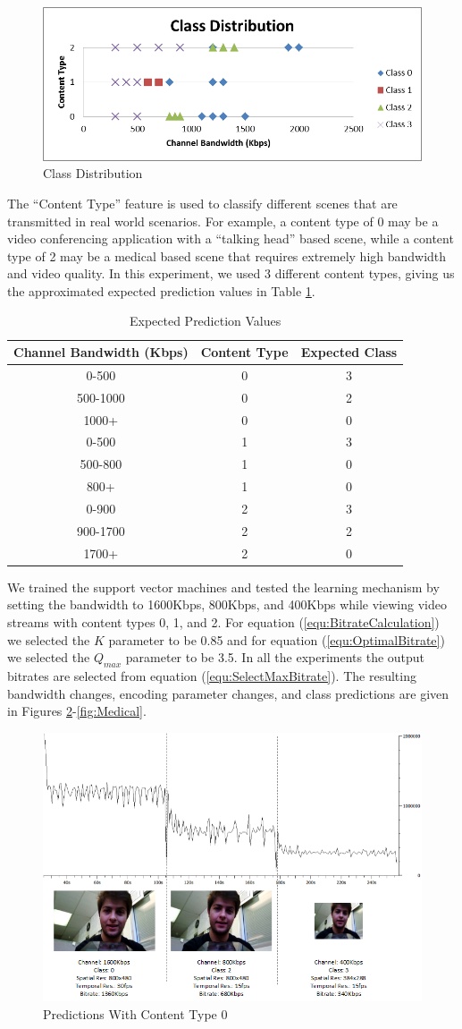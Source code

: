 \documentclass[preprint, 12pt]{elsarticle}
\begin{document}
\begin{figure}[h]
\centering
\includegraphics[width=0.5\linewidth]{ClassDistribution.png}
\caption{Class Distribution}
\label{fig:ClassDistribution}
\end{figure}
The ``Content Type'' feature is used to classify different scenes that are transmitted in real world scenarios. For example, a content type of 0 may be a video conferencing application with a ``talking head'' based scene, while a content type of 2 may be a medical based scene that requires extremely high bandwidth and video quality. In this experiment, we used 3 different content types, giving us the approximated expected prediction values in Table \ref{tab:ExpectedValues}.
\begin{table}
\caption{Expected Prediction Values}
\label{tab:ExpectedValues}
\begin{tabular}{c|c|c}
\textbf{Channel Bandwidth (Kbps)}&\textbf{Content Type}&\textbf{Expected Class}\\
\hline
0-500&0&3\\
500-1000&0&2\\
1000+&0&0\\
0-500&1&3\\
500-800&1&0\\
800+&1&0\\
0-900&2&3\\
900-1700&2&2\\
1700+&2&0
\end{tabular}
\end{table}
We trained the support vector machines and tested the learning mechanism by setting the bandwidth to 1600Kbps, 800Kbps, and 400Kbps while viewing video streams with content types 0, 1, and 2. For equation (\ref{equ:BitrateCalculation}) we selected the $K$ parameter to be 0.85 and for equation (\ref{equ:OptimalBitrate}) we selected the $Q_{max}$ parameter to be 3.5. In all the experiments the output bitrates are selected from equation (\ref{equ:SelectMaxBitrate}). The resulting bandwidth changes, encoding parameter changes, and class predictions are given in Figures \ref{fig:TalkingHead}-\ref{fig:Medical}.
\begin{figure}[h]
\centering
\includegraphics[width=0.5\linewidth]{TrainingExperimentTalkingHead.png}
\caption{Predictions With Content Type 0}
\label{fig:TalkingHead}
\end{figure}
\end{document}
